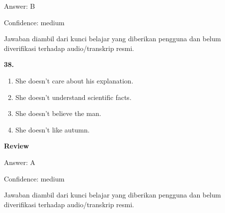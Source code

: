 \documentclass[12pt]{article}
\begin{document}
Answer: B\par
Confidence: medium\par
Jawaban diambil dari kunci belajar yang diberikan pengguna dan belum diverifikasi terhadap audio/transkrip resmi.\par
\endgroup
\par
\vspace{0.25\baselineskip}
\noindent\textbf{38.}
\begin{enumerate}[label=(\Alph*),leftmargin=*,itemsep=0.2em]
\item She doesn't care about his explanation.
\item She doesn't understand scientific facts.
\item She doesn't believe the man.
\item She doesn't like autumn.
\end{enumerate}
\par
\begingroup
\setlength{\parskip}{0pt}
\setlength{\parindent}{0pt}
\textbf{Review}\par
Answer: A\par
Confidence: medium\par
Jawaban diambil dari kunci belajar yang diberikan pengguna dan belum diverifikasi terhadap audio/transkrip resmi.\par
\endgroup
\par
\vspace{0.25\baselineskip}
\end{document}
